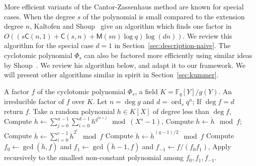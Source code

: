 \documentclass[12pt]{article}
\theoremstyle{plain}
\theoremstyle{definition}
\DeclareMathOperator{\order}{ord} %
\def\F{\ensuremath{\mathbb{F}}}
\def\MM{\ensuremath{\mathsf{M}}}
\def\CC{\ensuremath{\mathsf{C}}}
\newcounter{algorithm}
\begin{document}
More efficient variants of the Cantor-Zassenhaus method are known for
special cases. When the degree $s$ of the polynomial is small compared
to the extension degree $n$, Kaltofen and
Shoup~\cite{kaltofen+shoup97} give an algorithm which finds one factor
in $O((s\CC(n,1) + \CC(s,n) + \MM(sn)\log q)\log(dn))$. We review this
algorithm for the special case $d=1$ in
Section~\ref{sec:description-naive}. The cyclotomic polynomial
$\Phi_s$ can also be factored more efficiently using similar ideas by
Shoup~\cite{shoup94}. We review his algorithm below, and adapt it to
our framework. We will present other algorithms similar in spirit in
Section~\ref{sec:kummer}.

\begin{algorithm}
  \label{alg:cyclo}
  \begin{algorithmic}[1]
    \REQUIRE A factor $f$ of the cyclotomic polynomial $\Phi_s$, a field $K=\F_q[Y]/g(Y)$.
    \ENSURE An irreducible factor of $f$ over $K$.
    \STATE Let $n=\deg g$ and $d=\order_sq^n$;
    \STATE If $\deg f = d$ return $f$.
    \STATE Take a random polynomial $h\in K[X]$ of degree less than $\deg f$,
    \STATE\label{alg:cyclo:pt} Compute $\displaystyle\dot{h} \leftarrow\sum_{j=0}^{n-1} \sum_{i=0}^{d-1} h^{q^{in+j}} \mod (X^s-1)$,
    \STATE\label{alg:cyclo:mod} Compute $\ddot{h}\leftarrow \dot{h}\mod f$;
    \STATE\label{alg:cyclo:even} Compute $\displaystyle\dddot{h} \leftarrow \sum_{i=0}^{e-1} \ddot{h}^{2^i}\mod f$
    \ELSE
    \STATE\label{alg:cyclo:odd} Compute $\dddot{h} \leftarrow \ddot{h}^{(q-1)/2}\mod f$
    \ENDIF
    \STATE\label{alg:cyclo:gcd} Compute $f_0\leftarrow\gcd(\dddot{h},f)$ and $f_1\leftarrow\gcd(\dddot{h}-1,f)$ and $f_{-1}\leftarrow f/(f_0f_1)$,
    \STATE Apply recursively to the smallest non-constant polynomial among $f_0,f_1,f_{-1}$.
  \end{algorithmic}
\end{algorithm}
\end{document}
